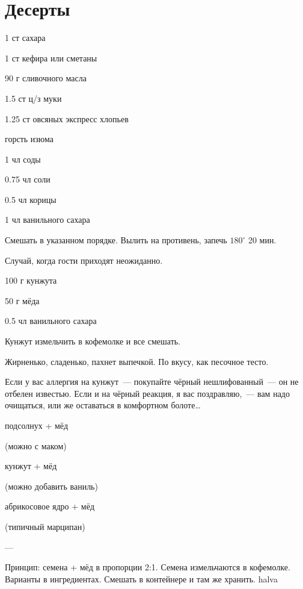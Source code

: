 \chapter*{Десерты}
\label{sec:sweet}



{
\item 1 ст сахара
\item 1 ст кефира или сметаны
\item 90 г сливочного масла
\item 1.5 ст ц/з муки
\item 1.25 ст овсяных экспресс хлопьев %
\item горсть изюма
}{
\item 1 чл соды
\item 0.75 чл соли
\item 0.5 чл корицы
\item 1 чл ванильного сахара
}{
Смешать в указанном порядке. Вылить на противень, запечь $180^{\circ}$ 20 мин.
}{
\begin{advice}
\item Случай, когда гости приходят неожиданно.
\end{advice}}{}



{\label{cookies}
\item 100 г кунжута 
\item 50 г мёда
}{
\item 0.5 чл ванильного сахара
}{
Кунжут измельчить в кофемолке и все смешать.
}{
\begin{advice}
    \item  Жирненько, сладенько, пахнет выпечкой. По вкусу, как песочное тесто.
\item Если у вас аллергия на кунжут~--- покупайте чёрный нешлифованный~— он не отбелен известью. Если и на чёрный реакция, я вас поздравляю,~— вам надо очищаться, или же оставаться в комфортном болоте\ldots

\end{advice}}{}



{


\item подсолнух + мёд

    (можно с маком)
\item кунжут + мёд 

    (можно добавить ваниль)
\item абрикосовое ядро + мёд 

    (типичный марципан)

}{
\item ---
}{
Принцип: семена + мёд в пропорции 2:1. Семена измельчаются в кофемолке. Варианты в ингредиентах.
Смешать в контейнере и там же хранить.
}{}{halva}




